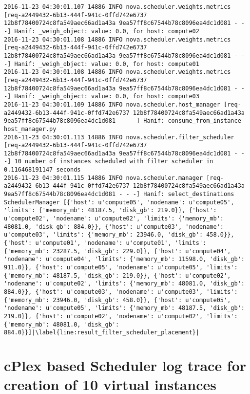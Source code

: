 \begin{lstlisting}[frame=single, caption={The filter scheduler log trace for 10 virtual instances}, label={lst:filterschedulercodetracelog10vi}, escapechar=|]
2016-11-23 04:30:01.107 14886 INFO nova.scheduler.weights.metrics [req-a2449432-6b13-444f-941c-0ffd742e6737 12b8f78400724c8fa549aec66ad1a43a 9ea57ff8c67544b78c8096ea4dc1d081 - - -] Hanif: _weigh_object: value: 0.0, for host: compute02
2016-11-23 04:30:01.108 14886 INFO nova.scheduler.weights.metrics [req-a2449432-6b13-444f-941c-0ffd742e6737 12b8f78400724c8fa549aec66ad1a43a 9ea57ff8c67544b78c8096ea4dc1d081 - - -] Hanif: _weigh_object: value: 0.0, for host: compute01
2016-11-23 04:30:01.108 14886 INFO nova.scheduler.weights.metrics [req-a2449432-6b13-444f-941c-0ffd742e6737 12b8f78400724c8fa549aec66ad1a43a 9ea57ff8c67544b78c8096ea4dc1d081 - - -] Hanif: _weigh_object: value: 0.0, for host: compute03
2016-11-23 04:30:01.109 14886 INFO nova.scheduler.host_manager [req-a2449432-6b13-444f-941c-0ffd742e6737 12b8f78400724c8fa549aec66ad1a43a 9ea57ff8c67544b78c8096ea4dc1d081 - - -] Hanif: consume_from_instance host_manager.py
2016-11-23 04:30:01.113 14886 INFO nova.scheduler.filter_scheduler [req-a2449432-6b13-444f-941c-0ffd742e6737 12b8f78400724c8fa549aec66ad1a43a 9ea57ff8c67544b78c8096ea4dc1d081 - - -] 10 number of instances scheduled with filter scheduler in 0.116468191147 seconds
2016-11-23 04:30:01.115 14886 INFO nova.scheduler.manager [req-a2449432-6b13-444f-941c-0ffd742e6737 12b8f78400724c8fa549aec66ad1a43a 9ea57ff8c67544b78c8096ea4dc1d081 - - -] Hanif: select_destinations SchedulerManager [{'host': u'compute05', 'nodename': u'compute05', 'limits': {'memory_mb': 48187.5, 'disk_gb': 219.0}}, {'host': u'compute02', 'nodename': u'compute02', 'limits': {'memory_mb': 48081.0, 'disk_gb': 884.0}}, {'host': u'compute03', 'nodename': u'compute03', 'limits': {'memory_mb': 23946.0, 'disk_gb': 458.0}}, {'host': u'compute01', 'nodename': u'compute01', 'limits': {'memory_mb': 23287.5, 'disk_gb': 229.0}}, {'host': u'compute04', 'nodename': u'compute04', 'limits': {'memory_mb': 11598.0, 'disk_gb': 911.0}}, {'host': u'compute05', 'nodename': u'compute05', 'limits': {'memory_mb': 48187.5, 'disk_gb': 219.0}}, {'host': u'compute02', 'nodename': u'compute02', 'limits': {'memory_mb': 48081.0, 'disk_gb': 884.0}}, {'host': u'compute03', 'nodename': u'compute03', 'limits': {'memory_mb': 23946.0, 'disk_gb': 458.0}}, {'host': u'compute05', 'nodename': u'compute05', 'limits': {'memory_mb': 48187.5, 'disk_gb': 219.0}}, {'host': u'compute02', 'nodename': u'compute02', 'limits': {'memory_mb': 48081.0, 'disk_gb': 884.0}}]|\label{line:result_filter_scheduler_placement}|
\end{lstlisting}

\section{cPlex based Scheduler log trace for creation of 10 virtual instances}\label{app:sec:cplexschedulerlogtrace10vi}

